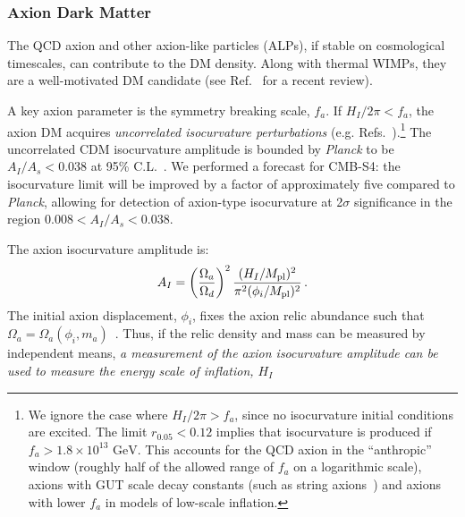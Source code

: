 \subsubsection{Axion Dark Matter}

The QCD axion and other axion-like particles (ALPs), if stable on cosmological timescales, can contribute to the DM density. Along with thermal WIMPs, they are a well-motivated DM candidate (see Ref.~\cite{Marsh:2015xka} for a recent review).

A key axion parameter is the symmetry breaking scale, $f_a$. If $H_I/2\pi<f_a$, the axion DM acquires \emph{uncorrelated isocurvature perturbations} (e.g. Refs.~\cite{Axenides:1983hj,Fox:2004kb,Hertzberg:2008wr}).\footnote{We ignore the case where $H_I/2\pi>f_a$, since no isocurvature initial conditions are excited. The limit $r_{0.05}<0.12$ implies that isocurvature is produced if $f_a>1.8\times 10^{13}\text{ GeV}$. This accounts for the QCD axion in the ``anthropic'' window (roughly half of the allowed range of $f_a$ on a logarithmic scale), axions with GUT scale decay constants (such as string axions~\cite{Svrcek:2006yi,Arvanitaki:2009fg}) and axions with lower $f_a$ in models of low-scale inflation.} The uncorrelated CDM isocurvature amplitude is bounded by \emph{Planck} to be $A_I/A_s<0.038$ at 95\% C.L.~\cite{Ade:2015lrj}. We performed a forecast for CMB-S4: the isocurvature limit will be improved by a factor of approximately five compared to \emph{Planck}, allowing for detection of axion-type isocurvature at 2$\sigma$ significance in the region $0.008<A_I/A_s<0.038$.

The axion isocurvature amplitude is:
\begin{equation}
A_I = \left(\frac{\Omega_a}{\Omega_d}\right)^2\frac{(H_I/M_{\rm pl})^2}{\pi^2(\phi_i/M_{\rm pl})^2} \, .
\label{eqn:iso_amplitude}
\end{equation}
The initial axion displacement, $\phi_i$, fixes the axion relic abundance such that $\Omega_a=\Omega_a (\phi_i,m_a)$~\cite{Preskill:1982cy,Abbott:1982af,Dine:1982ah,Turner:1983he,Steinhardt:1983ia,Marsh:2010wq}. Thus, if the relic density and mass can be measured by independent means, \emph{a measurement of the axion isocurvature amplitude can be used to measure the energy scale of inflation, $H_I$}

